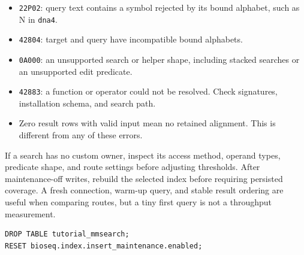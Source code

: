 \begin{itemize}
  \item \texttt{22P02}: query text contains a symbol rejected by its bound
    alphabet, such as N in \texttt{dna4}.
  \item \texttt{42804}: target and query have incompatible bound alphabets.
  \item \texttt{0A000}: an unsupported search or helper shape, including
    stacked searches or an unsupported edit predicate.
  \item \texttt{42883}: a function or operator could not be resolved. Check
    signatures, installation schema, and search path.
  \item Zero result rows with valid input mean no retained alignment. This
    is different from any of these errors.
\end{itemize}

If a search has no custom owner, inspect its access method, operand types,
predicate shape, and route settings before adjusting thresholds. After
maintenance-off writes, rebuild the selected index before requiring persisted
coverage. A fresh connection, warm-up query, and stable result ordering are
useful when comparing routes, but a tiny first query is not a throughput
measurement.

\par\noindent\begin{minipage}{\linewidth}
\begin{lstlisting}[style=bioseq-appendix-sql]
DROP TABLE tutorial_mmsearch;
RESET bioseq.index.insert_maintenance.enabled;
\end{lstlisting}
\end{minipage}
